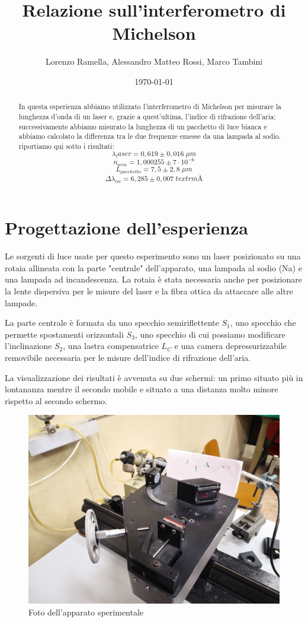 \documentclass{article}
\title{Relazione sull'interferometro di Michelson}
\author{Lorenzo Ramella, Alessandro Matteo Rossi, Marco Tambini}
\date{\today}
\begin{document}
\maketitle

\begin{abstract}
In questa esperienza abbiamo utilizzato l'interferometro di Michelson per misurare la lunghezza d'onda di un laser e, grazie a quest'ultima, l'indice di rifrazione dell'aria; successivamente abbiamo misurato la lunghezza di un pacchetto di luce bianca e abbiamo calcolato la differenza tra le due frequenze emesse da una lampada al sodio.
riportiamo qui sotto i risultati:
\[ \lambda_laser = 0,619 \pm 0,016 \; \mu m \]
\[ n_{aria} = 1,000255 \pm 7 \cdot 10^{-6} \]
\[ L_{pacchetto} = 7,5 \pm 2,8 \; \mu m \]
\[ \Delta \lambda_{na} = 6,285 \pm 0,007 \; textrm{Å} \]
\end{abstract}
\tableofcontents



\section{Progettazione dell'esperienza}
Le sorgenti di luce usate per questo esperimento sono un laser posizionato su una rotaia allineata con la parte "centrale" dell'apparato, una lampada al sodio (Na) e una lampada ad incandescenza. La rotaia è stata necessaria anche per posizionare la lente dispersiva per le misure del laser e la fibra ottica da attaccare alle altre lampade.

La parte centrale è formata da uno specchio semiriflettente $S_1$, uno specchio che permette spostamenti orizzontali $S_3$, uno specchio di cui possiamo modificare l'inclinazione $S_2$, una lastra compensatrice $L_C$ e una camera depressurizzabile removibile necessaria per le misure dell'indice di rifrazione dell'aria. 

La visualizzazione dei risultati è avvenuta su due schermi: un primo situato più in lontananza mentre il secondo mobile e situato a una distanza molto minore rispetto al secondo schermo.

\begin{figure}[h!]
  \centering
  \includegraphics[width=0.5\linewidth]{IM strumentazione}
  \caption{Foto dell'apparato sperimentale}
\end{figure}
\end{document}

